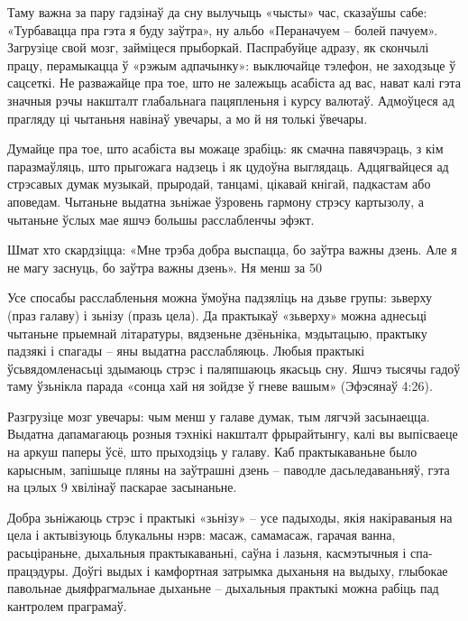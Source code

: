 Таму важна за пару гадзінаў да сну вылучыць «чысты» час, сказаўшы сабе: «Турбавацца пра гэта я буду заўтра», ну альбо «Пераначуем – болей пачуем». Загрузіце свой мозг, займіцеся прыборкай. Паспрабуйце адразу, як скончылі працу, перамыкацца ў «рэжым адпачынку»: выключайце тэлефон, не заходзьце ў сацсеткі. Не разважайце пра тое, што не залежыць асабіста ад вас, нават калі гэта значныя рэчы накшталт глабальнага пацяпленьня і курсу валютаў. Адмоўцеся ад прагляду ці чытаньня навінаў увечары, а мо й ня толькі ўвечары.

Думайце пра тое, што асабіста вы можаце зрабіць: як смачна павячэраць, з кім паразмаўляць, што прыгожага надзець і як цудоўна выглядаць. Адцягвайцеся ад стрэсавых думак музыкай, прыродай, танцамі, цікавай кнігай, падкастам або аповедам. Чытаньне выдатна зьніжае ўзровень гармону стрэсу картызолу, а чытаньне ўслых мае яшчэ большы расслабленчы эфэкт.

Шмат хто скардзіцца: «Мне трэба добра выспацца, бо заўтра важны дзень. Але я не магу заснуць, бо заўтра важны дзень». Ня менш за 50%

Усе спосабы расслабленьня можна ўмоўна падзяліць на дзьве групы: зьверху (праз галаву) і зьнізу (празь цела). Да практыкаў «зьверху» можна аднесьці чытаньне прыемнай літаратуры, вядзеньне дзёньніка, мэдытацыю, практыку падзякі і спагады – яны выдатна расслабляюць. Любыя практыкі ўсьвядомленасьці здымаюць стрэс і паляпшаюць якасьць сну. Яшчэ тысячы гадоў таму ўзьнікла парада «сонца хай ня зойдзе ў гневе вашым» (Эфэсянаў 4:26).

Разгрузіце мозг увечары: чым менш у галаве думак, тым лягчэй засынаецца. Выдатна дапамагаюць розныя тэхнікі накшталт фрырайтынгу, калі вы выпісваеце на аркуш паперы ўсё, што прыходзіць у галаву. Каб практыкаваньне было карысным, запішыце пляны на заўтрашні дзень – паводле дасьледаваньняў, гэта на цэлых 9 хвілінаў паскарае засынаньне.

Добра зьніжаюць стрэс і практыкі «зьнізу» – усе падыходы, якія накіраваныя на цела і актывізуюць блукальны нэрв: масаж, самамасаж, гарачая ванна, расьціраньне, дыхальныя практыкаваньні, саўна і лазьня, касмэтычныя і спа-працэдуры. Доўгі выдых і камфортная затрымка дыханьня на выдыху, глыбокае павольнае дыяфрагмальнае дыханьне – дыхальныя практыкі можна рабіць пад кантролем праграмаў.

